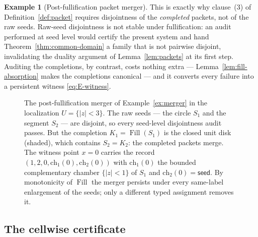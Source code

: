 \documentclass[11pt,reqno]{amsart}
\theoremstyle{definition}
\newtheorem{example}[theorem]{Example}
\theoremstyle{remark}
\newcommand{\Fill}{\operatorname{Fill}}
\begin{document}
\begin{example}[Post-fullification packet merger]
This is exactly why clause~(3) of Definition~\ref{def:packet} requires disjointness
of the \emph{completed} packets, not of the raw seeds. Raw-seed disjointness is not
stable under fullification: an audit performed at seed level would certify the
present system and hand Theorem~\ref{thm:common-domain} a family that is not
pairwise disjoint, invalidating the duality argument of Lemma~\ref{lem:packets} at
its first step. Auditing the completions, by contrast, costs nothing extra ---
Lemma~\ref{lem:fill-absorption} makes the completions canonical --- and it converts
every failure into a persistent witness \eqref{eq:E-witness}.
\end{example}

\begin{figure}[t]
\centering
{}
\caption{The post-fullification merger of Example~\ref{ex:merger} in the
localization $U=\{|z|<3\}$. The raw seeds --- the circle $S_1$ and the segment
$S_2$ --- are disjoint, so every seed-level disjointness audit passes. But the
completion $K_1=\Fill(S_1)$ is the closed unit disk (shaded), which contains
$S_2=K_2$: the completed packets merge. The witness point $x=0$ carries the record
$(1,2,0,\mathrm{ch}_1(0),\mathrm{ch}_2(0))$ with $\mathrm{ch}_1(0)$ the bounded
complementary chamber $\{|z|<1\}$ of $S_1$ and $\mathrm{ch}_2(0)=\textsf{seed}$. By
monotonicity of $\Fill$ the merger persists under every same-label enlargement of
the seeds; only a different typed assignment removes it.}
\label{fig:merger}
\end{figure}

\subsection{The cellwise certificate}\label{subsec:E-cellwise}
\end{document}
